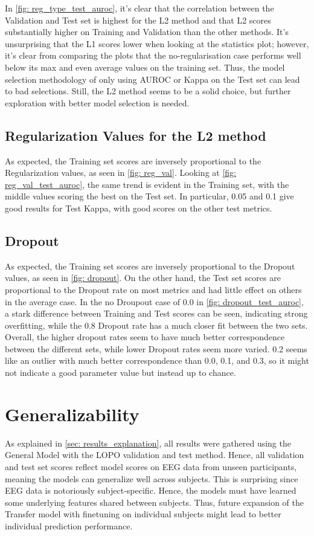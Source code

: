 In \autoref{fig: reg_type_test_auroc}, it's clear that the correlation between the Validation and Test set is highest for the L2 method and that L2 scores substantially higher on Training and Validation than the other methods. It's unsurprising that the L1 scores lower when looking at the statistics plot; however, it's clear from comparing the plots that the no-regularisation case performs well below its max and even average values on the training set. Thus, the model selection methodology of only using AUROC or Kappa on the Test set can lead to bad selections. Still, the L2 method seems to be a solid choice, but further exploration with better model selection is needed.

\subsection{Regularization Values for the L2 method}
As expected, the Training set scores are inversely proportional to the Regularization values, as seen in \autoref{fig: reg_val}. Looking at \autoref{fig: reg_val_test_auroc}, the same trend is evident in the Training set, with the middle values scoring the best on the Test set. In particular, 0.05 and 0.1 give good results for Test Kappa, with good scores on the other test metrics. 

\subsection{Dropout}
As expected, the Training set scores are inversely proportional to the Dropout values, as seen in \autoref{fig: dropout}. On the other hand, the Test set scores are proportional to the Dropout rate on most metrics and had little effect on others in the average case. In the no Droupout case of 0.0 in \autoref{fig: dropout_test_auroc}, a stark difference between Training and Test scores can be seen, indicating strong overfitting, while the 0.8 Dropout rate has a much closer fit between the two sets. Overall, the higher dropout rates seem to have much better correspondence between the different sets, while lower Dropout rates seem more varied. 0.2 seems like an outlier with much better correspondence than 0.0, 0.1, and 0.3, so it might not indicate a good parameter value but instead up to chance.

\section{Generalizability}
As explained in \autoref{sec: results_explanation}, all results were gathered using the General Model with the LOPO validation and test method. Hence, all validation and test set scores reflect model scores on EEG data from unseen participants, meaning the models can generalize well across subjects. This is surprising since EEG data is notoriously subject-specific. Hence, the models must have learned some underlying features shared between subjects. Thus, future expansion of the Transfer model with finetuning on individual subjects might lead to better individual prediction performance. 

